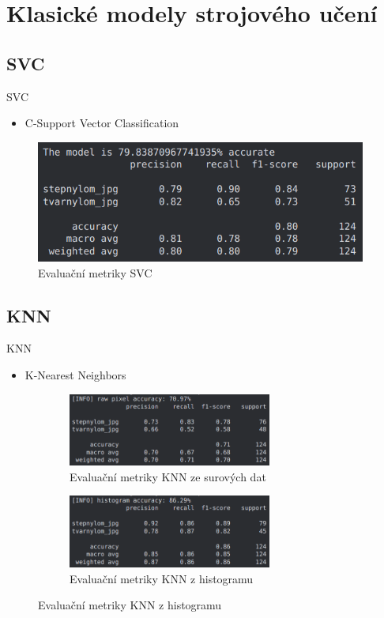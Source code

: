 \documentclass[aspectratio=169]{beamer}
\begin{document}
\section{Klasické modely strojového učení}

\subsection{SVC}

\begin{frame}{SVC}
    \begin{itemize}
        \item C-Support Vector Classification
    \end{itemize}
    \begin{figure}
        \centering
        \includegraphics[height=4cm]{SVC_table.png}
        \caption{Evaluační metriky SVC}
    \end{figure}
\end{frame}

\subsection{KNN}

\begin{frame}{KNN}
    \begin{itemize}
        \item K-Nearest Neighbors
    \end{itemize}
    \begin{figure}
        \centering
        \begin{subfigure}{.5\textwidth}
            \centering
            \includegraphics[height=2.4cm]{KNNr_table.png}
            \caption{Evaluační metriky KNN ze surových dat}
            \label{fig:sub1}
        \end{subfigure}%
        \begin{subfigure}{.5\textwidth}
            \centering
            \includegraphics[height=2.4cm]{KNNh_table.png}
            \caption{Evaluační metriky KNN z histogramu}
            \label{fig:sub2}
        \end{subfigure}
    \end{figure}
\end{frame}
\end{document}
